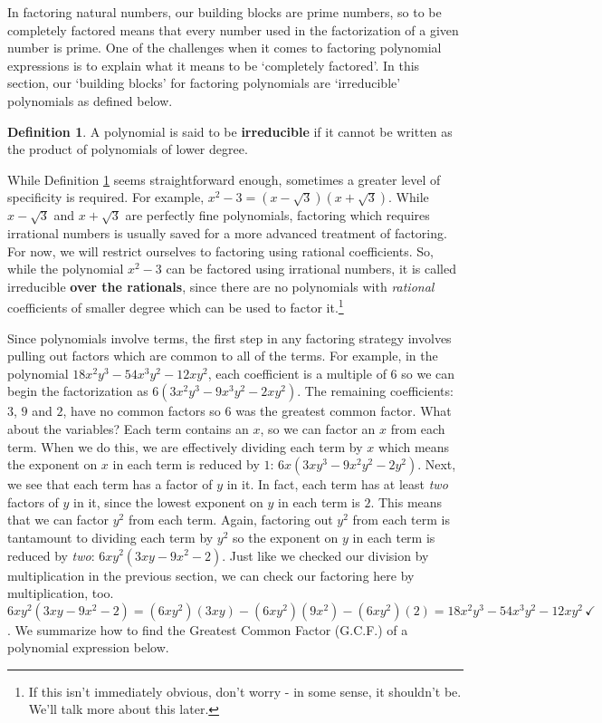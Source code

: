 \documentclass[11pt]{article}
\theoremstyle{definition}  %
\newtheorem{defn}{\bf Definition}
\newcommand{\bbm}{\begin{boxedminipage}{6.41in}}
\newcommand{\ebm}{\end{boxedminipage}}
\begin{document}
\smallskip

In factoring natural numbers, our building blocks are prime numbers, so to be completely factored means that every number used in the factorization of a given number is prime. One of the challenges when it comes to factoring polynomial expressions is to explain what it means to be `completely factored'. In this section, our `building blocks' for factoring polynomials are `irreducible' polynomials as defined below.

\medskip

\colorbox{ResultColor}{\bbm \begin{defn}\label{irreduciblepoly}  A polynomial is said to be \textbf{irreducible} if it cannot be written as the product of polynomials of lower degree.
\end{defn}
\ebm}

\medskip

While Definition \ref{irreduciblepoly} seems straightforward enough, sometimes a greater level of specificity is required. For example, $x^2 - 3 = (x-\sqrt{3})(x + \sqrt{3})$.  While $x-\sqrt{3}$ and $x+\sqrt{3}$ are perfectly fine polynomials, factoring which requires irrational numbers is usually saved for a more advanced treatment of factoring.  For now, we will restrict ourselves to factoring using rational coefficients. So, while the polynomial $x^2 - 3$ can be factored using irrational numbers, it is called irreducible \textbf{over the rationals}, since there are no polynomials with \textit{rational} coefficients of smaller degree which can be used to factor it.\footnote{If this isn't immediately obvious, don't worry - in some sense, it shouldn't be.  We'll talk more about this later.} 

\medskip

Since polynomials involve terms, the first step in any factoring strategy involves pulling out factors which are common to all of the terms.  For example, in the polynomial $18x^2y^3 - 54x^3y^2 - 12xy^2$,  each coefficient is a multiple of $6$ so we can begin the factorization as $6(3x^2y^3 - 9x^3y^2 - 2xy^2)$.  The remaining coefficients: $3$, $9$ and $2$, have no common factors so $6$ was the greatest common factor.  What about the variables? Each term contains an $x$, so we can factor an $x$ from each term.  When we do this, we are effectively dividing each term by $x$ which means the exponent on  $x$ in each term is reduced by $1$:  $6x(3xy^3 - 9x^2y^2 - 2y^2)$.  Next, we see that each term has a factor of $y$ in it.  In fact, each term has at least \textit{two} factors of $y$ in it, since the lowest exponent on $y$ in each term is $2$. This means that we can factor $y^2$ from each term. Again, factoring out $y^2$ from each term is tantamount to dividing each term by $y^2$ so the exponent on $y$ in each term is reduced by \textit{two}:  $6xy^2(3xy - 9x^2 - 2)$.  Just like we checked our division by multiplication in the previous section, we can check our factoring here by multiplication, too.  $6xy^2(3xy - 9x^2 - 2) = (6xy^2)(3xy) - (6xy^2)(9x^2) - (6xy^2)(2) = 18x^2y^3 - 54x^3y^2  - 12xy^2 \, \checkmark$.  We summarize how to find the Greatest Common Factor (G.C.F.) of a polynomial expression below.
\end{document}
